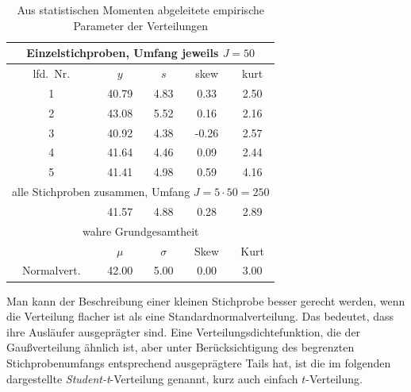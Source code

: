 \begin{table}
\caption{\label{tab:empirischeVerteilungsParameter} Aus statistischen Momenten abgeleitete empirische
Parameter der Verteilungen}
\begin{center}
\begin{tabular}{c||c|c|c|c}
\hline
\multicolumn{5}{c}{Einzelstichproben, Umfang jeweils $J = 50$}\\
\hline
lfd.\ Nr. & $y$ & $s$ & skew & kurt\\
\hline\hline
1 & 40.79 &  4.83 &  0.33 &  2.50 \\
2 & 43.08 &  5.52 &  0.16 &  2.16 \\
3 & 40.92 &  4.38 & -0.26 &  2.57 \\
4 & 41.64 &  4.46 &  0.09 &  2.44 \\
5 & 41.41 &  4.98 &  0.59 &  4.16 \\
\hline\hline
\multicolumn{5}{c}{alle Stichproben zusammen, Umfang $J = 5 \cdot 50 = 250$}\\
\hline
 & 41.57 &  4.88 &  0.28 &  2.89 \\
\hline\hline
\multicolumn{5}{c}{wahre Grundgesamtheit}\\
\hline
 & $\mu$ & $\sigma$ & Skew & Kurt\\
\hline\hline
Normalvert. & 42.00 &  5.00 &  0.00 &  3.00 \\
\hline
\end{tabular}
\end{center}
\end{table}


Man kann der Beschreibung einer kleinen Stichprobe besser gerecht werden, wenn die
Verteilung flacher ist als eine Standardnormalverteilung. Das bedeutet, dass ihre Ausläufer
ausgeprägter sind.
Eine Verteilungsdichtefunktion, die der Gaußverteilung ähnlich ist, aber unter
Berücksichtigung des begrenzten Stichprobenumfangs entsprechend ausgeprägtere Tails hat,
ist die im folgenden dargestellte \textsl{Student-t}-Verteilung genannt, kurz auch
einfach $t$-Verteilung.



